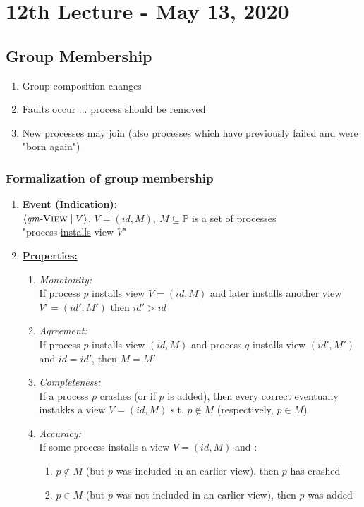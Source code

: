 \documentclass{article}
\begin{document}
	\section{12th Lecture - May 13, 2020}
	\begin{adjustwidth}{2em}{2em}
		\subsection{Group Membership}
		\begin{adjustwidth}{2em}{2em}
			\begin{enumerate}[-]
				\item Group composition changes
				\item Faults occur ... process should be removed
				\item New processes may join (also processes which have previously failed and were "born again")
			\end{enumerate}
			\subsubsection{Formalization of group membership}
			\begin{adjustwidth}{2em}{}
				\begin{enumerate}[-]
					\item \underline{\textbf{Event (Indication):}} \\
					$\langle \textit{gm-}\textsc{View} \mid V \rangle$, $V = (\textit{id},M), \ M \subseteq \mathbb{P}$ is a set of processes \\
					"process \underline{installs} view $V$"
					\item \underline{\textbf{Properties:}}
					\begin{enumerate}[\textbullet]
						\item \textit{Monotonity:} \\
						If process $p$ installs view $V = (\textit{id}, M)$ and later installs another view $V' = (\textit{id}', M')$ then $id' > id$
						\item \textit{Agreement:} \\
						If process $p$ installs view $(\textit{id}, M)$ and process $q$ installs view $(\textit{id}', M')$ and $id = id'$, then $M = M'$
						\item \textit{Completeness:} \\
						If a process $p$ crashes (or if $p$ is added), then every correct eventually instakks a view $V = (\textit{id},M)$ s.t. $p \not\in M$ (respectively, $p \in M$)
						\item \textit{Accuracy:} \\
						If some process installs a view $V = (\textit{id},M)$ and :
						\begin{enumerate}[-]
							\item $p \not\in M$ (but $p$ was included in an earlier view), then $p$ has crashed
							\item $p \in M$ (but $p$ was not included in an earlier view), then $p$ was added
						\end{enumerate}
						

\end{enumerate}
\end{enumerate}
\end{adjustwidth}
\end{adjustwidth}
\end{adjustwidth}
\end{document}
